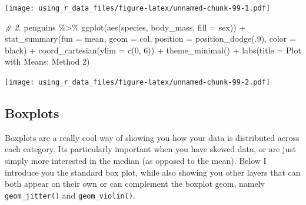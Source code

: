 \documentclass[
]{book}
\newenvironment{Shaded}{\begin{snugshade}}{\end{snugshade}}
\newcommand{\AttributeTok}[1]{\textcolor[rgb]{0.77,0.63,0.00}{#1}}
\newcommand{\CommentTok}[1]{\textcolor[rgb]{0.56,0.35,0.01}{\textit{#1}}}
\newcommand{\DecValTok}[1]{\textcolor[rgb]{0.00,0.00,0.81}{#1}}
\newcommand{\FunctionTok}[1]{\textcolor[rgb]{0.00,0.00,0.00}{#1}}
\newcommand{\NormalTok}[1]{#1}
\newcommand{\SpecialCharTok}[1]{\textcolor[rgb]{0.00,0.00,0.00}{#1}}
\newcommand{\StringTok}[1]{\textcolor[rgb]{0.31,0.60,0.02}{#1}}
\begin{document}
\texttt{[image: using\_r\_data\_files/figure-latex/unnamed-chunk-99-1.pdf]}

\begin{Shaded}
\begin{Highlighting}[]
\CommentTok{\# 2.}
\NormalTok{penguins }\SpecialCharTok{\%\textgreater{}\%} 
  \FunctionTok{ggplot}\NormalTok{(}\FunctionTok{aes}\NormalTok{(species, body\_mass, }\AttributeTok{fill =}\NormalTok{ sex)) }\SpecialCharTok{+}
  \FunctionTok{stat\_summary}\NormalTok{(}\AttributeTok{fun =}\NormalTok{ mean, }\AttributeTok{geom =} \StringTok{\textquotesingle{}col\textquotesingle{}}\NormalTok{, }\AttributeTok{position =} \FunctionTok{position\_dodge}\NormalTok{(.}\DecValTok{9}\NormalTok{), }
               \AttributeTok{color =} \StringTok{\textquotesingle{}black\textquotesingle{}}\NormalTok{) }\SpecialCharTok{+}
  \FunctionTok{coord\_cartesian}\NormalTok{(}\AttributeTok{ylim =} \FunctionTok{c}\NormalTok{(}\DecValTok{0}\NormalTok{, }\DecValTok{6}\NormalTok{)) }\SpecialCharTok{+}
  \FunctionTok{theme\_minimal}\NormalTok{() }\SpecialCharTok{+}
  \FunctionTok{labs}\NormalTok{(}\AttributeTok{title =} \StringTok{\textquotesingle{}Plot with Means: Method 2\textquotesingle{}}\NormalTok{)}
\end{Highlighting}
\end{Shaded}

\texttt{[image: using\_r\_data\_files/figure-latex/unnamed-chunk-99-2.pdf]}

\hypertarget{boxplots}{%
\subsection{Boxplots}\label{boxplots}}

Boxplots are a really cool way of showing you how your data is distributed across each category.
Its particularly important when you have skewed data, or are just simply more interested in the median (as opposed to the mean).
Below I introduce you the standard box plot, while also showing you other layers that can both appear on their own or can complement the boxplot geom, namely \texttt{geom\_jitter()} and \texttt{geom\_violin()}.
\end{document}
